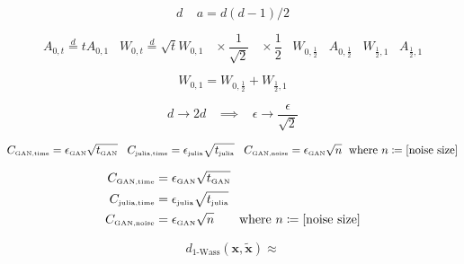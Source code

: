\documentclass[a4paper,11pt]{article}
\renewcommand{\tilde}{\widetilde}
\begin{document}
\[
d \;\;\;\; a = d(d-1)/2
\]

\[
A_{0,t} \overset{d}{=} t A_{0,1} \;\;\; W_{0,t} \overset{d}{=} \sqrt{t} W_{0,1} \;\;\; \times \frac{1}{\sqrt{2}} \;\;\; \times \frac{1}{2} \;\;\; W_{0,\frac{1}{2}} \;\;\; A_{0,\frac{1}{2}} \;\;\; W_{\frac{1}{2}, 1} \;\;\; A_{\frac{1}{2}, 1}
\]

\[
W_{0,1} = W_{0,\frac{1}{2}} + W_{\frac{1}{2}, 1}
\]

\[
d \rightarrow 2d \;\;\; \implies \;\;\; \epsilon \rightarrow \frac{\epsilon}{\sqrt{2}}
\]

\[
C_{\text{\tiny GAN,time}} = \epsilon_{\text{\tiny GAN}} \sqrt{t_{\text{\tiny GAN}}}  \;\;\; C_{\text{\tiny julia,time}} = \epsilon_{\text{\tiny julia}} \sqrt{t_{\text{\tiny julia}}}  \;\;\; C_{\text{\tiny GAN,noise}} = \epsilon_{\text{\tiny GAN}} \sqrt{n} \;\text{ where } n \coloneqq \text{[noise size]}
\]

\begin{align}
    C_{\text{\tiny GAN,time}} &= \epsilon_{\text{\tiny GAN}} \sqrt{t_{\text{\tiny GAN}}} \\        
    C_{\text{\tiny julia,time}} &= \epsilon_{\text{\tiny julia}} \sqrt{t_{\text{\tiny julia}}} \\
    C_{\text{\tiny GAN,noise}} &= \epsilon_{\text{\tiny GAN}} \sqrt{n} \;\;\;\;\;\; \text{ where } n \coloneqq \text{[noise size]}
\end{align}

\[
d_{\text{1-Wass}}({\boldsymbol x}, \tilde{{\boldsymbol x}}) \approx
\]
\end{document}
